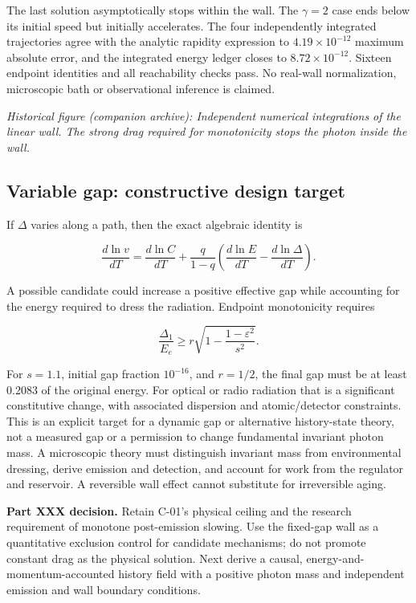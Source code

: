 \documentclass[
  11pt,
  twoside]{article}
\begin{document}
The last solution asymptotically stops within the wall. The \(\gamma=2\)
case ends below its initial speed but initially accelerates. The four
independently integrated trajectories agree with the analytic rapidity
expression to \(4.19\times10^{-12}\) maximum absolute error, and the
integrated energy ledger closes to \(8.72\times10^{-12}\). Sixteen
endpoint identities and all reachability checks pass. No real-wall
normalization, microscopic bath or observational inference is claimed.

\emph{Historical figure (companion archive): Independent numerical
integrations of the linear wall. The strong drag required for
monotonicity stops the photon inside the wall.}

\subsection{Variable gap: constructive design
target}\label{variable-gap-constructive-design-target}

If \(\Delta\) varies along a path, then the exact algebraic identity is

\[\frac{d\ln v}{dT}=\frac{d\ln C}{dT}+\frac{q}{1-q}\left(\frac{d\ln E}{dT}-\frac{d\ln\Delta}{dT}\right).\]

A possible candidate could increase a positive effective gap while
accounting for the energy required to dress the radiation. Endpoint
monotonicity requires

\[\frac{\Delta_1}{E_e}\geq r\sqrt{1-\frac{1-\varepsilon^2}{s^2}}.\]

For \(s=1.1\), initial gap fraction \(10^{-16}\), and \(r=1/2\), the
final gap must be at least 0.2083 of the original energy. For optical or
radio radiation that is a significant constitutive change, with
associated dispersion and atomic/detector constraints. This is an
explicit target for a dynamic gap or alternative history-state theory,
not a measured gap or a permission to change fundamental invariant
photon mass. A microscopic theory must distinguish invariant mass from
environmental dressing, derive emission and detection, and account for
work from the regulator and reservoir. A reversible wall effect cannot
substitute for irreversible aging.

\textbf{Part XXX decision.} Retain C-01's physical ceiling and the
research requirement of monotone post-emission slowing. Use the
fixed-gap wall as a quantitative exclusion control for candidate
mechanisms; do not promote constant drag as the physical solution. Next
derive a causal, energy-and-momentum-accounted history field with a
positive photon mass and independent emission and wall boundary
conditions.
\end{document}
